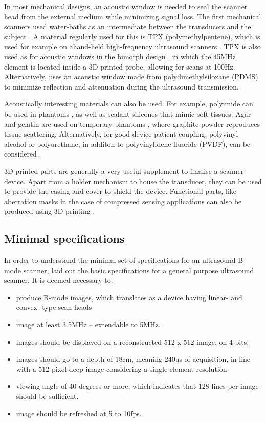 \documentclass{article}
\begin{document}
In most mechanical designs, an acoustic window is needed to seal the scanner head from the external medium while minimizing signal loss. The first mechanical scanners used water-baths as an intermediate between the transducers and the subject \cite{schueler_fundamentals_1984}. A material regularly used for this is TPX (polymethylpentene), which is used for example on ahand-held high-frequency ultrasound scanners \cite{erickson_hand-held_2001}. TPX is also used as for acoustic windows in the bimorph design \cite{brown_low_2013}, in which the 45MHz element is located inside a 3D printed probe, allowing for scans at 100Hz. Alternatively, \cite{qiu_ultrasound_2020} uses an acoustic window made from polydimethylsiloxane (PDMS) to minimize reflection and
attenuation during the ultrasound transmission.

Acoustically interesting materials can also be used. For example, polyimide can be used in phantoms \cite{xu_high-frequency_2008, lei_sun_high-frame_2008}, as well as sealant silicones \cite{lorenzo_experimental_2009} that mimic soft tissues. Agar and gelatin are used on temporary phantoms \cite{vogt_development_2005,chun_ultrasound_2015}, where graphite powder reproduces tissue scattering. Alternatively, for good device-patient coupling, polyvinyl alcohol or polyurethane, in additon to polyvinylidene fluoride (PVDF), can be considered \cite{sikdar_novel_2014}.

3D-printed parts are generally a very useful supplement to finalise a scanner device. Apart from a holder mechanism to house the transducer, they can be used to provide the casing and cover to shield the device. Functional parts, like aberration masks in the case of compressed sensing applications can also be produced using 3D printing \cite{kruizinga_compressive_2017}.

\subsection{Minimal specifications}

In order to understand the minimal set of specifications for an ultrasound B-mode scanner, \cite{kurjak_use_1986} laid out the basic specifications for a general purpose ultrasound scanner. It is deemed necessary to:

\begin{itemize}
\item produce B-mode images, which translates as a device having linear- and convex- type scan-heads
\item image at least 3.5MHz -- extendable to 5MHz.
\item images should be displayed on a reconstructed 512 x 512 image, on 4 bits.
\item images should go to a depth of 18cm, meaning 240us of acquisition, in line with a 512 pixel-deep image considering a single-element resolution. 
\item viewing angle of 40 degrees or more, which indicates that 128 lines per image should be sufficient.
\item image should be refreshed at 5 to 10fps.
\end{itemize}
\end{document}
